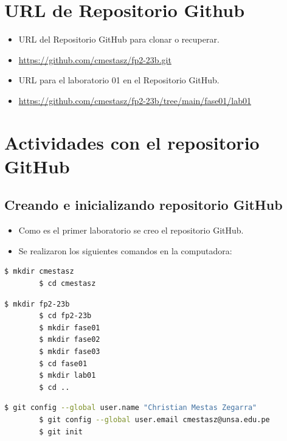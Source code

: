 \documentclass{article}
\begin{document}
\section{URL de Repositorio Github}
\begin{itemize}
	\item URL del Repositorio GitHub para clonar o recuperar.
	\item \url{https://github.com/cmestasz/fp2-23b.git}
	\item URL para el laboratorio 01 en el Repositorio GitHub.
	\item \url{https://github.com/cmestasz/fp2-23b/tree/main/fase01/lab01}
\end{itemize}

\section{Actividades con el repositorio GitHub}

\subsection{Creando e inicializando repositorio GitHub}
\begin{itemize}
	\item Como es el primer laboratorio se creo el repositorio GitHub.
	\item Se realizaron los siguientes comandos en la computadora:
\end{itemize}

\begin{lstlisting}[language=bash,caption={Creando directorio de trabajo}]
		$ mkdir cmestasz
		$ cd cmestasz
	\end{lstlisting}
\begin{lstlisting}[language=bash,caption={Creando directorio para repositorio GitHub}]
		$ mkdir fp2-23b
		$ cd fp2-23b
		$ mkdir fase01
		$ mkdir fase02
		$ mkdir fase03
		$ cd fase01
		$ mkdir lab01
		$ cd ..
	\end{lstlisting}
\begin{lstlisting}[language=bash,caption={Inicializando repositorio GitHub}]
		$ git config --global user.name "Christian Mestas Zegarra"
		$ git config --global user.email cmestasz@unsa.edu.pe
		$ git init
	\end{lstlisting}
\end{document}
